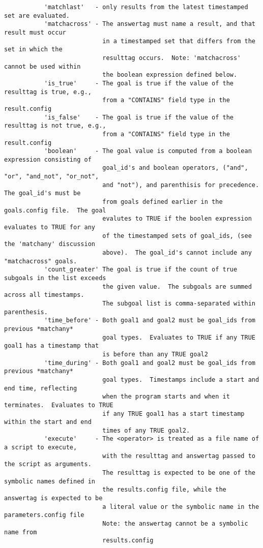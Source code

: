 \documentclass{article}
\begin{document}
\begin{verbatim}
           'matchlast'   - only results from the latest timestamped set are evaluated.
           'matchacross' - The answertag must name a result, and that result must occur
                           in a timestamped set that differs from the set in which the 
                           resulttag occurs.  Note: 'matchacross' cannot be used within 
                           the boolean expression defined below.
           'is_true'     - The goal is true if the value of the resulttag is true, e.g., 
                           from a "CONTAINS" field type in the result.config
           'is_false'    - The goal is true if the value of the resulttag is not true, e.g., 
                           from a "CONTAINS" field type in the result.config
           'boolean'     - The goal value is computed from a boolean expression consisting of 
                           goal_id's and boolean operators, ("and", "or", "and_not", "or_not", 
                           and "not"), and parenthisis for precedence.  The goal_id's must be 
                           from goals defined earlier in the goals.config file.  The goal 
                           evalutes to TRUE if the boolen expression evaluates to TRUE for any
                           of the timestamped sets of goal_ids, (see the 'matchany' discussion 
                           above).  The goal_id's cannot include any "matchacross" goals.
           'count_greater' The goal is true if the count of true subgoals in the list exceeds 
                           the given value.  The subgoals are summed across all timestamps.  
                           The subgoal list is comma-separated within parenthesis.
           'time_before' - Both goal1 and goal2 must be goal_ids from previous *matchany* 
                           goal types.  Evaluates to TRUE if any TRUE goal1 has a timestamp that 
                           is before than any TRUE goal2
           'time_during' - Both goal1 and goal2 must be goal_ids from previous *matchany* 
                           goal types.  Timestamps include a start and end time, reflecting 
                           when the program starts and when it terminates.  Evaluates to TRUE 
                           if any TRUE goal1 has a start timestamp within the start and end 
                           times of any TRUE goal2.
           'execute'     - The <operator> is treated as a file name of a script to execute,
                           with the resulttag and answertag passed to the script as arguments.
                           The resulttag is expected to be one of the symbolic names defined in
                           the results.config file, while the answertag is expected to be
                           a literal value or the symbolic name in the parameters.config file
                           Note: the answertag cannot be a symbolic name from 
                           results.config 
 

\end{verbatim}
\end{document}
